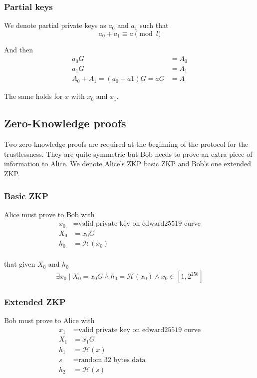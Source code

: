 \documentclass{llncs}
\begin{document}
\subsubsection{Partial keys}
We denote partial private keys as $a_0$ and $a_1$ such that
$$a_0 + a_1 \equiv a \pmod l$$

And then
\begin{equation}
\begin{split}
    a_0G &= A_0 \\
    a_1G &= A_1 \\
    A_0 + A_1 = (a_0 + a1)G = aG &= A
\end{split}
\end{equation}

The same holds for $x$ with $x_0$ and $x_1$.

\subsection{Zero-Knowledge proofs}
Two zero-knowledge proofs are required at the beginning of the protocol for the trustlessness. They are quite symmetric but Bob needs to prove an extra piece of information to Alice. We denote Alice's ZKP basic ZKP and Bob's one extended ZKP.

\subsubsection{Basic ZKP}
Alice must prove to Bob with
\begin{equation}
\begin{split}
    x_0 &= \text{valid private key on edward25519 curve} \\
    X_0 &= x_0G \\
    h_0 &= \mathcal{H}(x_0) \\
\end{split}
\end{equation}

that given $X_0$ and $h_0$
\begin{equation}
\begin{split}
    \exists x_0 \mid X_0 = x_0G \land h_0 = \mathcal{H}(x_0) \land x_0 \in [1, 2^{256}]
\end{split}
\end{equation}

\subsubsection{Extended ZKP}
Bob must prove to Alice with
\begin{equation}
\begin{split}
    x_1 &= \text{valid private key on edward25519 curve} \\
    X_1 &= x_1G \\
    h_1 &= \mathcal{H}(x) \\
    s &= \text{random 32 bytes data} \\
    h_2 &= \mathcal{H}(s)
\end{split}
\end{equation}
\end{document}
